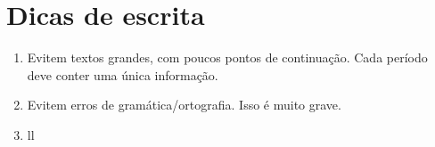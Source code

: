 \section{Dicas de escrita}
\begin{enumerate}
\item Evitem textos grandes, com poucos pontos de continuação. Cada período deve conter uma única informação.
\item Evitem erros de gramática/ortografia. Isso é muito grave.
\item ll
\end{enumerate}
